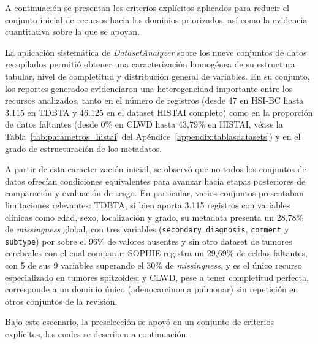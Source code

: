 A continuación se presentan los criterios explícitos aplicados para reducir el conjunto inicial de recursos hacia los dominios priorizados, así como la evidencia cuantitativa sobre la que se apoyan.

La aplicación sistemática de \textit{DatasetAnalyzer} sobre los nueve conjuntos de datos recopilados permitió obtener una caracterización homogénea de su estructura tabular, nivel de completitud y distribución general de variables. En su conjunto, los reportes generados evidenciaron una heterogeneidad importante entre los recursos analizados, tanto en el número de registros (desde 47 en HSI-BC hasta 3.115 en TDBTA y 46.125 en el dataset HISTAI completo) como en la proporción de datos faltantes (desde 0\% en CLWD hasta 43,79\% en HISTAI, véase la Tabla~\ref{tab:parametros_histai} del Apéndice~\ref{appendix:tablasdatasets}) y en el grado de estructuración de los metadatos.

A partir de esta caracterización inicial, se observó que no todos los conjuntos de datos ofrecían condiciones equivalentes para avanzar hacia etapas posteriores de comparación y evaluación de sesgo. En particular, varios conjuntos presentaban limitaciones relevantes: TDBTA, si bien aporta 3.115 registros con variables clínicas como edad, sexo, localización y grado, su metadata presenta un 28,78\% de \textit{missingness} global, con tres variables (\texttt{secondary\_diagnosis}, \texttt{comment} y \texttt{subtype}) por sobre el 96\% de valores ausentes y sin otro dataset de tumores cerebrales con el cual comparar; SOPHIE registra un 29,69\% de celdas faltantes, con 5 de sus 9 variables superando el 30\% de \textit{missingness}, y es el único recurso especializado en tumores spitzoides; y CLWD, pese a tener completitud perfecta, corresponde a un dominio único (adenocarcinoma pulmonar) sin repetición en otros conjuntos de la revisión.

Bajo este escenario, la preselección se apoyó en un conjunto de criterios explícitos, los cuales se describen a continuación:

